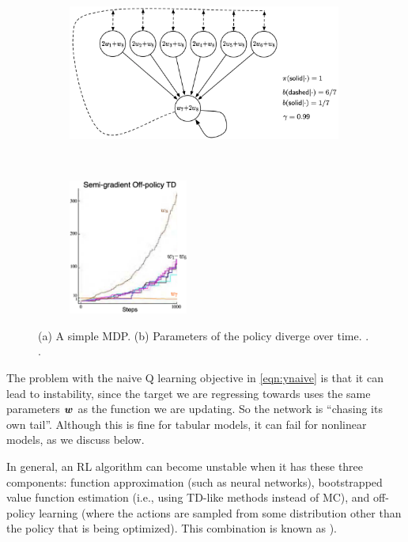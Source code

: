 \begin{figure}
\centering
\begin{subfigure}[b]{0.55\textwidth}
\centering
\includegraphics[height=1.75in]{figs/bairdExample}
\caption{ }
\label{fig:baird-example-mdp}
\end{subfigure}
~
\begin{subfigure}[b]{0.35\textwidth}
\centering
\includegraphics[height=1.75in]{figs/bairdExampleDivergence}
\caption{ }
\label{fig:baird-example-divergence}
\end{subfigure}
\caption{
(a) A simple MDP.
  (b) Parameters of the policy diverge over time.
.
.
}
\label{fig:baird-example}
\end{figure}



The problem with the naive Q learning  objective in \cref{eqn:ynaive}
  is that it can lead to instability,
since the target we are regressing towards
uses the same parameters ${\bm{w}}$ as the function we are updating.
So the network is ``chasing its own tail''.
Although this is fine for tabular models,  it can fail
for nonlinear models, as we discuss below.

In general, an RL algorithm can become unstable when it has
these three components:
function approximation (such as neural networks),
bootstrapped value function estimation (i.e., using TD-like methods instead of MC),
and off-policy learning (where the actions are sampled from some distribution
other than the policy that is being optimized).
This combination is known as 
\citep{Sutton2015, Vanhasselt18}).

